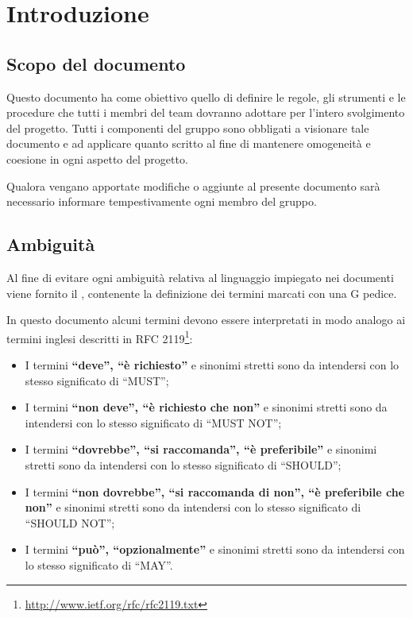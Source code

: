 \section{Introduzione}

\subsection{Scopo del documento}

Questo documento ha come obiettivo quello di definire le regole, gli strumenti e le procedure che tutti i membri del team dovranno adottare per l'intero svolgimento del progetto. Tutti i componenti del gruppo sono obbligati a visionare tale documento e ad applicare quanto scritto al fine di mantenere omogeneità e coesione in ogni aspetto del progetto.

Qualora vengano apportate modifiche o aggiunte al presente documento sarà necessario informare tempestivamente ogni membro del gruppo.

\subsection{Ambiguità}

Al fine di evitare ogni ambiguità relativa al linguaggio impiegato nei documenti viene fornito il \Glossario{}, contenente la definizione dei termini marcati con una G pedice.

In questo documento alcuni termini devono essere interpretati in modo analogo ai termini inglesi descritti in RFC 2119\footnote{\url{http://www.ietf.org/rfc/rfc2119.txt}}:
\begin{itemize}
 \item I termini \textbf{``deve'', ``è richiesto''} e sinonimi stretti sono da intendersi con lo stesso significato di ``MUST'';
 \item I termini \textbf{``non deve'', ``è richiesto che non''} e sinonimi stretti sono da intendersi con lo stesso significato di ``MUST NOT'';
 \item I termini \textbf{``dovrebbe'', ``si raccomanda'', ``è preferibile''} e sinonimi stretti sono da intendersi con lo stesso significato di ``SHOULD'';
 \item I termini \textbf{``non dovrebbe'', ``si raccomanda di non'', ``è preferibile che non''} e sinonimi stretti sono da intendersi con lo stesso significato di ``SHOULD NOT'';
 \item I termini \textbf{``può'', ``opzionalmente''} e sinonimi stretti sono da intendersi con lo stesso significato di ``MAY''.
\end{itemize}
